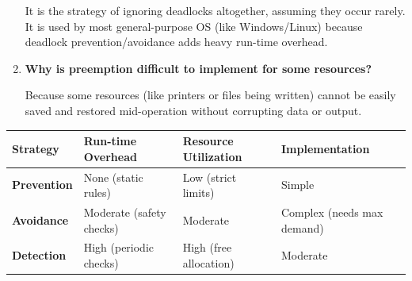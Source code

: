 \documentclass[12pt,a4paper]{article}
\newcommand{\Q}[1]{\textbf{#1}\par\noindent\ignorespaces}
\renewcommand{\arraystretch}{1.45}
\begin{document}
\begin{tcolorbox}[exambox, title={\textbf{Frequently Asked / Viva Questions}}]
\begin{enumerate}[topsep=0pt, label=\textbf{Q\arabic*.}, itemsep=5pt]
    It is the strategy of ignoring deadlocks altogether, assuming they occur rarely. It is used by most general-purpose OS (like Windows/Linux) because deadlock prevention/avoidance adds heavy run-time overhead.
  \item \Q{Why is preemption difficult to implement for some resources?}
    Because some resources (like printers or files being written) cannot be easily saved and restored mid-operation without corrupting data or output.
\end{enumerate}
\end{tcolorbox}

\begin{tcolorbox}[tikzbox, title={Deadlock Handling Trade-offs}]
\renewcommand{\arraystretch}{1.4}
\par\noindent
\begin{tabularx}{\linewidth}{|B{2.2cm}|>{\small\centering\arraybackslash}X|>{\small\centering\arraybackslash}X|>{\small\centering\arraybackslash}X|}
\hline
\textbf{Strategy} & \textbf{\color{myred}Run-time Overhead} & \textbf{\color{myteal}Resource Utilization} & \textbf{\color{myamber}Implementation} \\
\hline
\textbf{Prevention} & None (static rules) & Low (strict limits) & Simple \\
\hline
\textbf{Avoidance} & Moderate (safety checks) & Moderate & Complex (needs max demand) \\
\hline
\textbf{Detection} & High (periodic checks) & High (free allocation) & Moderate \\
\hline
\end{tabularx}
\end{tcolorbox}
\end{document}
